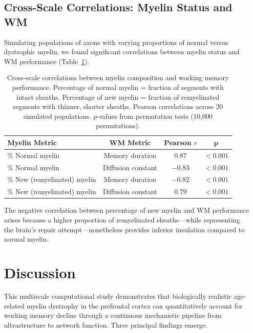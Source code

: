 \documentclass[11pt]{article}
\begin{document}
\subsection{Cross-Scale Correlations: Myelin Status and WM}

Simulating populations of axons with varying proportions of normal versus dystrophic myelin, we found significant correlations between myelin status and WM performance (Table~\ref{tab:crossscale}).

\begin{table}[H]
\centering
\caption{Cross-scale correlations between myelin composition and working memory performance. Percentage of normal myelin = fraction of segments with intact sheaths. Percentage of new myelin = fraction of remyelinated segments with thinner, shorter sheaths. Pearson correlations across 20 simulated populations. $p$-values from permutation tests (10,000 permutations).}
\label{tab:crossscale}
\begin{tabular}{lccc}
\toprule
\textbf{Myelin Metric} & \textbf{WM Metric} & \textbf{Pearson $r$} & $\boldsymbol{p}$ \\
\midrule
\% Normal myelin & Memory duration & $0.87$ & $< 0.001$ \\
\% Normal myelin & Diffusion constant & $-0.83$ & $< 0.001$ \\
\% New (remyelinated) myelin & Memory duration & $-0.82$ & $< 0.001$ \\
\% New (remyelinated) myelin & Diffusion constant & $0.79$ & $< 0.001$ \\
\bottomrule
\end{tabular}
\end{table}

The negative correlation between percentage of new myelin and WM performance arises because a higher proportion of remyelinated sheaths---while representing the brain's repair attempt---nonetheless provides inferior insulation compared to normal myelin.

\section{Discussion}

This multiscale computational study demonstrates that biologically realistic age-related myelin dystrophy in the prefrontal cortex can quantitatively account for working memory decline through a continuous mechanistic pipeline from ultrastructure to network function. Three principal findings emerge.
\end{document}
